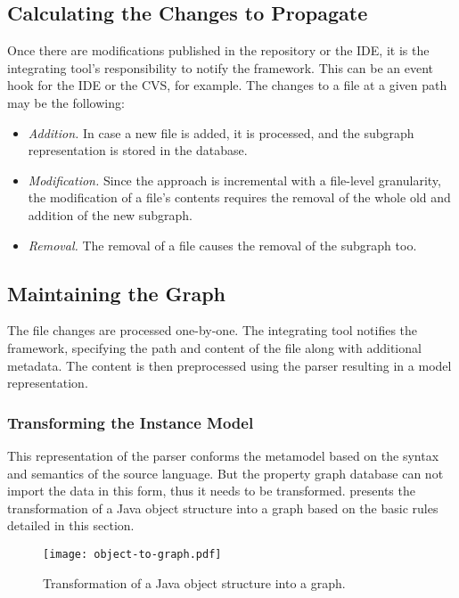 \subsection{Calculating the Changes to Propagate}
Once there are modifications published in the repository or the IDE, it is the integrating tool's responsibility to notify the framework. This can be an event hook for the IDE or the CVS, for example. The changes to a file at a given path may be the following:

\begin{itemize}[topsep=0pt]
  \item \emph{Addition.} In case a new file is added, it is processed, and the subgraph representation is stored in the database.

  \item \emph{Modification.} Since the approach is incremental with a file-level granularity, the modification of a file's contents requires the removal of the whole old and addition of the new subgraph.

  \item \emph{Removal.} The removal of a file causes the removal of the subgraph too.
\end{itemize}

\subsection{Maintaining the Graph}
\label{sect:maintaining-the-graph}

The file changes are processed one-by-one. The integrating tool notifies the framework, specifying the path and content of the file along with additional metadata. The content is then preprocessed using the parser resulting in a model representation.

\subsubsection{Transforming the Instance Model}
This representation of the parser conforms the metamodel based on the syntax and semantics of the source language. But the property graph database can not import the data in this form, thus it needs to be transformed.  presents the transformation of a Java object structure into a graph based on the basic rules detailed in this section.

\begin{figure}[!htb]
  \centering
  \texttt{[image: object-to-graph.pdf]}
  \caption{Transformation of a Java object structure into a graph.}
  \label{fig:object-to-graph}
\end{figure}

